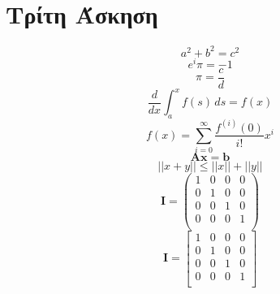 \documentclass[a4paper,11pt]{article}
\begin{document}
\section{Τρίτη Άσκηση}
\vspace*{1 cm}
  	\begin{equation*}
		a^2+b^2=c^2
	\end{equation*}
	\begin{equation*}
		e^i\pi=-1
	\end{equation*}
	\begin{equation*}
		\pi = \frac{c}{d}
	\end{equation*}
	\begin{equation*}
		\frac{d}{dx} \int_{a}^{x} f(s) \,ds = f(x)
	\end{equation*}
	\begin{equation*}
		f(x)= \sum_{i=0}^{\infty} \frac{f^{(i)}(0)}{i!}x^i
	\end{equation*}
	\begin{equation*}
		\mathbf{Ax = b}
	\end{equation*}
	\begin{equation*}
		||x +y|| \leq ||x||+||y||
	\end{equation*}
	\vspace*{1 cm}
	\begin{equation}
		\mathbf{I} = \begin{pmatrix}
			1&0&0&0\\
			0&1&0&0\\
			0&0&1&0\\
			0&0&0&1\\
		\end{pmatrix} 
	\end{equation}
	\vspace*{1 cm}
	\begin{equation}
		\mathbf{I} = \begin{bmatrix}
			1&0&0&0\\
			0&1&0&0\\
			0&0&1&0\\
			0&0&0&1\\
		\end{bmatrix} 
	\end{equation}
	\vspace*{1 cm}
\end{document}
